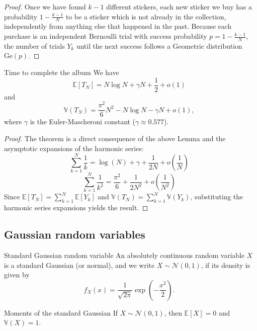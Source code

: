 \documentclass[11pt, a4paper]{article}
\begin{document}
\begin{proof} %
Once we have found $k-1$ different stickers, each new sticker we buy has a probability $1 - \frac{k-1}{N}$ to be a sticker which is not already in the collection, independently from anything else that happened in the past. %
Because each purchase is an independent Bernoulli trial with success probability $p = 1 - \frac{k-1}{N}$, the number of trials $Y_k$ until the next success follows a Geometric distribution $\text{Ge}(p)$.
\end{proof}

\begin{theorem}{Time to complete the album}{} %
We have
\[ \mathbb{E}[T_N] = N \log N + \gamma N + \frac{1}{2} + o(1) \] %
and
\[ \mathbb{V}(T_N) = \frac{\pi^2}{6}N^2 - N \log N - \gamma N + o(1), \] %
where $\gamma$ is the Euler-Mascheroni constant ($\gamma \approx 0.577$). %
\end{theorem}

\begin{proof} %
The theorem is a direct consequence of the above Lemma and the asymptotic expansions of the harmonic series: %
\[ \sum_{k=1}^N \frac{1}{k} = \log(N) + \gamma + \frac{1}{2N} + o\left(\frac{1}{N}\right) \] %
\[ \sum_{k=1}^N \frac{1}{k^2} = \frac{\pi^2}{6} + \frac{1}{2N^2} + o\left(\frac{1}{N^2}\right) \] %
Since $\mathbb{E}[T_N] = \sum_{k=1}^N \mathbb{E}[Y_k]$ and $\mathbb{V}(T_N) = \sum_{k=1}^N \mathbb{V}(Y_k)$, substituting the harmonic series expansions yields the result.
\end{proof}

\subsection{Gaussian random variables} %

\begin{definition}{Standard Gaussian random variable}{} %
An absolutely continuous random variable $X$ is a standard Gaussian (or normal), and we write $X \sim \mathcal{N}(0,1)$, if its density is given by %
\[ f_X(x) = \frac{1}{\sqrt{2\pi}} \exp\left(-\frac{x^2}{2}\right). \] %
\end{definition}

\begin{proposition}{Moments of the standard Gaussian}{} %
If $X \sim \mathcal{N}(0,1)$, then $\mathbb{E}[X] = 0$ and $\mathbb{V}(X) = 1$. %
\end{proposition}
\end{document}
